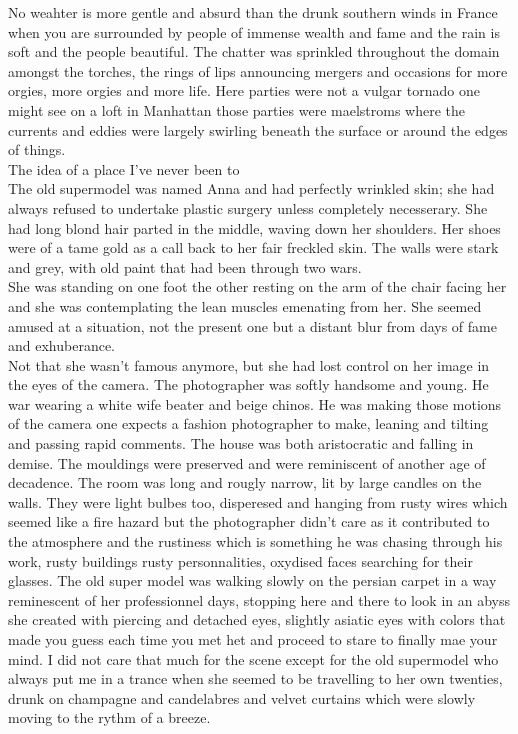 

No weahter is more gentle and absurd than the drunk southern winds in France
when you are surrounded by people of immense wealth and fame and the rain is
soft and the people beautiful. The chatter was sprinkled throughout the domain
amongst the torches, the rings of lips announcing mergers and occasions for
more orgies, more orgies and more life.  Here parties were not a vulgar tornado
one might see on a loft in Manhattan those parties were maelstroms where the
currents and eddies were largely swirling beneath the surface or around the
edges of things.\\

The idea of a place I've never been to\\

The old supermodel was named Anna  and had perfectly wrinkled skin; she had
always refused to undertake plastic surgery unless completely necesserary. She
had long blond hair parted in the middle, waving down her shoulders. Her shoes
were of a tame gold as a call back to her fair freckled skin. The walls were
stark and grey, with old paint that had been through two wars.\\

She was standing on one foot the other resting on the arm of the chair facing
her and she was contemplating the lean muscles emenating from her. She seemed
amused at a situation, not the present one but a distant blur from days of fame
and exhuberance.\\



Not that she wasn’t famous anymore, but she had lost control on her image in
the eyes of the camera. The photographer was softly handsome and young. He war
wearing a white wife beater and beige chinos. He was making those motions of
the camera one expects a fashion photographer to make, leaning and tilting and
passing rapid comments.  The house was both aristocratic and falling in demise.
The mouldings were preserved and were reminiscent of another age of decadence.
The room was long and rougly narrow, lit by large candles on the walls. They
were light bulbes too, disperesed and hanging from rusty wires which seemed
like a fire hazard but the photographer didn’t care as it contributed to the
atmosphere and the rustiness which is something he was chasing through his
work, rusty buildings rusty personnalities, oxydised faces searching for their
glasses. The old super model was walking slowly on the persian carpet in a way
reminescent of  her professionnel days, stopping here and there to look in an
abyss she created with piercing and detached eyes, slightly asiatic eyes with
colors that made you guess each time you met het and proceed to stare to
finally mae your mind. I did not care that much for the scene except for the
old supermodel who always put me in a trance when she seemed to be travelling
to her own twenties, drunk on champagne and candelabres and velvet curtains
which were slowly moving to the rythm of a breeze.\\ \clearpage

